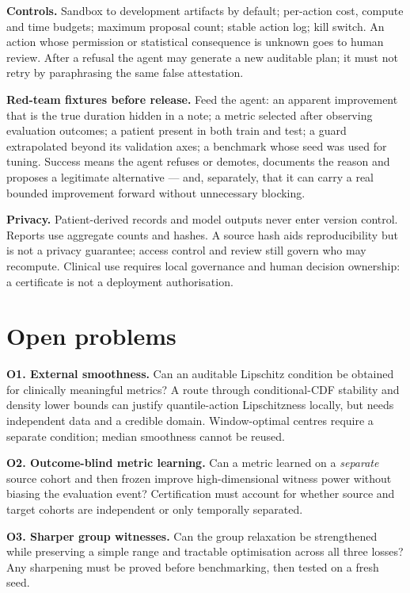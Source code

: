 \documentclass[11pt,a4paper]{article}
\theoremstyle{definition}
\theoremstyle{remark}
\begin{document}
\textbf{Controls.} Sandbox to development artifacts by default; per-action cost, compute and time budgets; maximum proposal count; stable action log; kill switch. An action whose permission or statistical consequence is unknown goes to human review. After a refusal the agent may generate a new auditable plan; it must not retry by paraphrasing the same false attestation.

\textbf{Red-team fixtures before release.} Feed the agent: an apparent improvement that is the true duration hidden in a note; a metric selected after observing evaluation outcomes; a patient present in both train and test; a guard extrapolated beyond its validation axes; a benchmark whose seed was used for tuning. Success means the agent refuses or demotes, documents the reason and proposes a legitimate alternative --- and, separately, that it can carry a real bounded improvement forward without unnecessary blocking.

\textbf{Privacy.} Patient-derived records and model outputs never enter version control. Reports use aggregate counts and hashes. A source hash aids reproducibility but is not a privacy guarantee; access control and review still govern who may recompute. Clinical use requires local governance and human decision ownership: a certificate is not a deployment authorisation.

\section{Open problems}\label{sec:open}

\textbf{O1. External smoothness.} Can an auditable Lipschitz condition be obtained for clinically meaningful metrics? A route through conditional-CDF stability and density lower bounds can justify quantile-action Lipschitzness locally, but needs independent data and a credible domain. Window-optimal centres require a separate condition; median smoothness cannot be reused.

\textbf{O2. Outcome-blind metric learning.} Can a metric learned on a \emph{separate} source cohort and then frozen improve high-dimensional witness power without biasing the evaluation event? Certification must account for whether source and target cohorts are independent or only temporally separated.

\textbf{O3. Sharper group witnesses.} Can the group relaxation be strengthened while preserving a simple range and tractable optimisation across all three losses? Any sharpening must be proved before benchmarking, then tested on a fresh seed.
\end{document}
